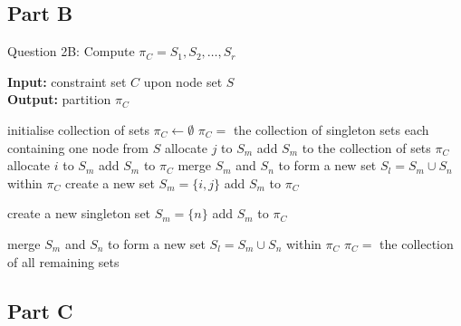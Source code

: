 \documentclass[a4paper, 11pt]{article}
\begin{document}
	\subsection{Part B}
	\label{section:2B}
	\begin{algorithm}
		\caption{Question 2B: Compute $\pi_{C} = S_{1}, S_{2}, \ldots, S_{r}$}
		\label{alg:partition}
		\textbf{Input:} constraint set $C$ upon node set $S$ \\
		\textbf{Output:} partition $\pi_{C}$
		
		\begin{algorithmic}[1]
			\STATE initialise collection of sets $\pi_{C} \leftarrow \emptyset$
				\RETURN $\pi_{C} = $ the collection of singleton sets each containing one node from $S$
			\ELSE
						\STATE allocate $j$ to $S_{m}$
						\STATE add $S_{m}$ to the collection of sets $\pi_{C}$
						\STATE allocate $i$ to $S_{m}$
						\STATE add $S_{m}$ to $\pi_{C}$
						\STATE merge $S_{m}$ and $S_{n}$ to form a new set $S_{l} = S_{m} \cup S_{n}$ within $\pi_{C}$
						\STATE create a new set $S_{m} = \{i, j\}$
						\STATE add $S_{m}$ to $\pi_{C}$
					\ENDIF
				\ENDFOR
			
					\STATE create a new singleton set $S_{m} = \{n\}$
					\STATE add $S_{m}$ to $\pi_{C}$
				\ENDFOR
			
						\STATE merge $S_{m}$ and $S_{n}$ to form a new set $S_{l} = S_{m} \cup S_{n}$ within $\pi_{C}$
					\ENDIF
				\ENDFOR
				\RETURN $\pi_{C} = $ the collection of all remaining sets
			\ENDIF
	\end{algorithmic}
	\end{algorithm}
		
	\subsection{Part C}
	\label{section:2C}
	
\end{document}
